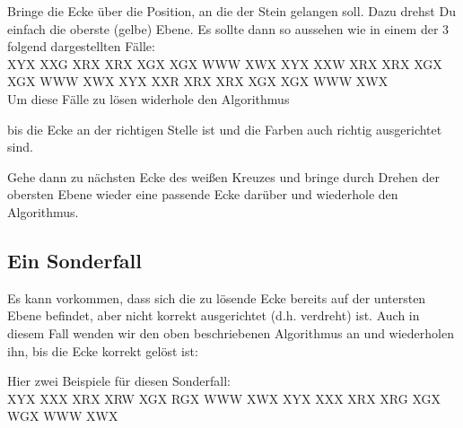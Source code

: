 Bringe die Ecke über die Position, an die der Stein gelangen soll. Dazu drehst
Du einfach die oberste (gelbe) Ebene. Es sollte dann so aussehen wie in einem der 3
folgend dargestellten Fälle: \\[1em]

\RubikCubeGreyAll%
            {X}{Y}{X}
            {X}{X}{G}%
               {X}{R}{X}
	       {X}{R}{X}%
	       {X}{G}{X}
	       {X}{G}{X}%
	      {W}{W}{W}
	      {X}{W}{X}%
%
\RubikCubeGreyAll%
            {X}{Y}{X}
            {X}{X}{W}%
               {X}{R}{X}
	       {X}{R}{X}%
	       {X}{G}{X}
	       {X}{G}{X}%
	      {W}{W}{W}
	      {X}{W}{X}%
%
\RubikCubeGreyAll%
            {X}{Y}{X}
            {X}{X}{R}%
               {X}{R}{X}
	       {X}{R}{X}%
	       {X}{G}{X}
	       {X}{G}{X}%
	      {W}{W}{W}
	      {X}{W}{X}%
\\[3em]
Um diese Fälle zu lösen widerhole den Algorithmus
\begin{center}
\end{center}
bis die Ecke an der richtigen Stelle ist und die Farben auch richtig
ausgerichtet sind.

Gehe dann zu nächsten Ecke des weißen Kreuzes und bringe durch Drehen der
obersten Ebene wieder eine passende Ecke darüber und wiederhole den Algorithmus.

\pagebreak
\subsection{Ein Sonderfall}
Es kann vorkommen, dass sich die zu lösende Ecke bereits auf der untersten Ebene befindet, aber nicht korrekt ausgerichtet (d.h. verdreht) ist.
Auch in diesem Fall wenden wir den oben beschriebenen Algorithmus an und wiederholen ihn, bis die Ecke korrekt gelöst ist:
\begin{center}
\end{center}
Hier zwei Beispiele für diesen Sonderfall:\\[1em]
\RubikCubeGreyAll%
            {X}{Y}{X}
            {X}{X}{X}%
               {X}{R}{X}
	       {X}{R}{W}%
	       {X}{G}{X}
	       {R}{G}{X}%
	      {W}{W}{W}
	      {X}{W}{X}%
%
\RubikCubeGreyAll%
            {X}{Y}{X}
            {X}{X}{X}%
               {X}{R}{X}
	       {X}{R}{G}%
	       {X}{G}{X}
	       {W}{G}{X}%
	      {W}{W}{W}
	      {X}{W}{X}%



